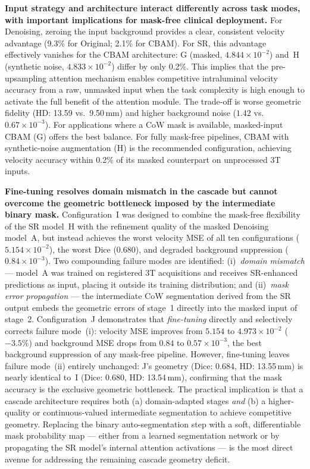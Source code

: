 \documentclass[11pt]{article}
\begin{document}
\textbf{Input strategy and architecture interact differently across task modes, with important
implications for mask-free clinical deployment.}  For Denoising, zeroing the input background
provides a clear, consistent velocity advantage (9.3\% for Original; 2.1\% for CBAM).  For SR,
this advantage effectively vanishes for the CBAM architecture: G (masked, $4.844{\times}10^{-2}$)
and~H (synthetic noise, $4.833{\times}10^{-2}$) differ by only 0.2\%.  This implies that the
pre-upsampling attention mechanism enables competitive intraluminal velocity accuracy from a raw,
unmasked input when the task complexity is high enough to activate the full benefit of the
attention module.  The trade-off is worse geometric fidelity (HD: 13.59 vs.\ 9.50\,mm) and
higher background noise ($1.42$ vs.\ $0.67{\times}10^{-3}$).  For applications where a CoW mask
is available, masked-input CBAM (G) offers the best balance.  For fully mask-free pipelines,
CBAM with synthetic-noise augmentation (H) is the recommended configuration, achieving velocity
accuracy within 0.2\% of its masked counterpart on unprocessed 3T inputs.

\textbf{Fine-tuning resolves domain mismatch in the cascade but cannot overcome the geometric
bottleneck imposed by the intermediate binary mask.}
Configuration~I was designed to combine the mask-free flexibility of the SR model~H with the
refinement quality of the masked Denoising model~A, but instead achieves the worst velocity MSE
of all ten configurations ($5.154{\times}10^{-2}$), the worst Dice (0.680), and degraded
background suppression ($0.84{\times}10^{-3}$).  Two compounding failure modes are identified:
(i)~\emph{domain mismatch} --- model~A was trained on registered 3T acquisitions and receives
SR-enhanced predictions as input, placing it outside its training distribution; and
(ii)~\emph{mask error propagation} --- the intermediate CoW segmentation derived from the SR
output embeds the geometric errors of stage~1 directly into the masked input of stage~2.
Configuration~J demonstrates that \emph{fine-tuning} directly and selectively corrects
failure mode~(i): velocity MSE improves from $5.154$ to $4.973{\times}10^{-2}$ ($-3.5\%$) and
background MSE drops from $0.84$ to $0.57{\times}10^{-3}$, the best background suppression of
any mask-free pipeline.  However, fine-tuning leaves failure mode~(ii) entirely unchanged:
J's geometry (Dice: 0.684, HD: 13.55\,mm) is nearly identical to~I (Dice: 0.680, HD:
13.54\,mm), confirming that the mask accuracy is the exclusive geometric bottleneck.  The
practical implication is that a cascade architecture requires both (a) domain-adapted stages
\emph{and} (b) a higher-quality or continuous-valued intermediate segmentation to achieve
competitive geometry.  Replacing the binary auto-segmentation step with a soft, differentiable
mask probability map --- either from a learned segmentation network or by propagating the SR
model's internal attention activations --- is the most direct avenue for addressing the
remaining cascade geometry deficit.
\end{document}
